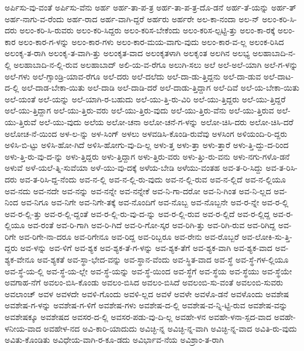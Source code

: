 {ಅರ್ಪಿಸು-ವು-ವಂತೆ
ಅರ್ಪಿಸು-ವೆನು
ಅರ್ಹ
ಅರ್ಹ-ತಾ-ಪ-ತ್ರ
ಅರ್ಹ-ತಾ-ಪ-ತ್ರ-ದೊ-ಡನೆ
ಅರ್ಹ-ತೆ-ಯನ್ನು
ಅರ್ಹ-ತ್
ಅರ್ಹ-ನಾಗು-ವ-ರೆಂದು
ಅರ್ಹ-ರಾದ
ಅರ್ಹ-ವಾಗಿ-ದ್ದರೆ
ಅರ್ಹರು
ಅರ್ಹರೇ
ಅಲ-ಕಾ-ನಂದಾ
ಅಲ-ನ್
ಅಲಂ-ಕರಿ-ಸಿ-ದರು
ಅಲಂ-ಕರಿ-ಸಿ-ರುವರು
ಅಲಂ-ಕರಿ-ಸಿದ್ದರು
ಅಲಂ-ಕರಿಸ-ಬೇಕೆಂದು
ಅಲಂ-ಕರಿಸ-ಲ್ಪಟ್ಟಿ-ತ್ತು
ಅಲಂ-ಕಾ-ರಕ್ಕೆ
ಅಲಂ-ಕಾರ
ಅಲಂ-ಕಾರ-ಗ-ಳನ್ನು
ಅಲಂ-ಕಾರ-ಗಳು
ಅಲಂ-ಕಾರ-ಮಯ-ವಾಗು-ವುದು
ಅಲಂ-ಕಾರ-ವ-ಲ್ಲ
ಅಲಂಕ-ರಿಸಿದ
ಅಲಂಕೃ-ತ-ರಾಗಿ
ಅಲಂಕೃ-ತ-ವಾಗಿ-ತ್ತು
ಅಲಂಕೃತ-ವಾದ
ಅಲಂಕೃತಳಾಗಿ
ಅಲಕೃಂತ
ಅಲಗಿನ
ಅಲಭ್ಯ
ಅಲಹಾಬಾದಿ-ನ-ಲ್ಲಿ
ಅಲಹಾಬಾದಿ-ನ-ಲ್ಲಿ-ರುವ
ಅಲಹಾಬಾದ್
ಅಲಿ-ಯ-ವ-ರೆಗೂ
ಅಲುಗಿ-ಸಲು
ಅಲೆ
ಅಲೆ-ಅಲೆ-ಯಾಗಿ
ಅಲೆ-ಗ-ಳನ್ನು
ಅಲೆ-ಗಳು
ಅಲೆ-ಗ್ಸಾಂಡ್ರಿ-ಯಾವ-ರೆಗೂ
ಅಲೆ-ದರು
ಅಲೆ-ದಲೆದು
ಅಲೆ-ದಾ-ಡು-ತ್ತಿದ್ದನು
ಅಲೆ-ದಾ-ಡುವ
ಅಲೆ-ದಾಟ-ದ-ಲ್ಲಿ
ಅಲೆ-ದಾಡ-ಬೇಕಾ-ಯಿತು
ಅಲೆ-ದಾಡಿ
ಅಲೆ-ದಾಡಿ-ದರೆ
ಅಲೆ-ದಾಡು-ತ್ತಿದ್ದಾಗ
ಅಲೆ-ದಿವೆ
ಅಲೆ-ಯ-ಬೇಕಾ-ಯಿತು
ಅಲೆ-ಯಂತೆ
ಅಲೆ-ಯನ್ನು
ಅಲೆ-ಯಾಗಿ-ರ-ಬಹುದು
ಅಲೆ-ಯು-ತ್ತಿ-ರು-ವಿರಿ
ಅಲೆ-ಯು-ತ್ತಿದ್ದರು
ಅಲೆ-ಯು-ತ್ತಿದ್ದರೆ
ಅಲೆ-ಯು-ತ್ತಿದ್ದಾಗ
ಅಲೆ-ಯು-ತ್ತಿರು-ವರು
ಅಲೆ-ಯು-ತ್ತಿರು-ವುದು
ಅಲೆ-ಯು-ತ್ತಿರು-ವೆನು
ಅಲೆ-ಯು-ತ್ತಿರುವ
ಅಲೆ-ಯು-ತ್ತಿರುವೆ
ಅಲೆ-ಯು-ವುದು
ಅಲೆಯ
ಅಲೋ-ಚನಾ
ಅಲೋ-ಚನೆ-ಗ-ಳನ್ನು
ಅಲೋ-ಚಿಸಿ-ದರು
ಅಲೋ-ಚಿಸಿ-ದರೆ
ಅಲೋಚ-ನೆ-ಯಿಂದ
ಅಳ-ಲ-ನ್ನು
ಅಳ-ಸಿಂಗ್
ಅಳಲು
ಅಳವಡಿಸಿ-ಕೊಂಡಿ-ರುವೆವು
ಅಳಸಿಂಗ
ಅಳಿಯಂದಿ-ರಿ-ದ್ದರು
ಅಳಿಸಿ-ಬಿ-ಟ್ಟು
ಅಳಿಸಿ-ಹೋ-ಗಿದೆ
ಅಳಿಸಿ-ಹೋಗು-ವು-ದಿ-ಲ್ಲ
ಅಳು-ತ್ತ
ಅಳು-ತ್ತಾ
ಅಳು-ತ್ತಾರೆ
ಅಳು-ತ್ತಿ-ದ್ದು-ದ-ರಿಂದ
ಅಳು-ತ್ತಿ-ರು-ವು-ದ-ನ್ನು
ಅಳು-ತ್ತಿದ್ದರು
ಅಳು-ತ್ತಿದ್ದಾಗ
ಅಳು-ತ್ತಿರು-ವರು
ಅಳು-ತ್ತಿು-ರು-ವನು
ಅಳು-ನಗು-ಗಳೊ-ಡನೆ
ಅಳುವೆ
ಅಳೆ-ಯಲೆ-ತ್ನಿ-ಸುವೆಯಾ
ಅಳೆ-ಯು-ವು-ದಕ್ಕೆ
ಅಳೆಯ-ಬೇಡಿ
ಅಳೆಯು-ವಂತಹ
ಅವ-ತ-ರಿ-ಸಿದ್ದು
ಅವ-ತ-ರಿಸಿ-ದರು
ಅವ-ತ-ರಿಸಿ-ದ್ದ-ನೆಂದು
ಅವ-ನ-ಲ್ಲಿ
ಅವ-ನ-ಲ್ಲಿ-ರು-ವುದು
ಅವ-ನ-ಲ್ಲಿ-ರುವ
ಅವ-ನ-ಲ್ಲಿದೆ
ಅವ-ನ-ಲ್ಲಿಯೂ
ಅವ-ನದು
ಅವ-ನದೇ
ಅವ-ನನ್ನು
ಅವ-ನನ್ನೇ
ಅವ-ನನ್ನೇಕೆ
ಅವ-ನಿ-ಗಾ-ದರೋ
ಅವ-ನಿ-ಗಿಂತ
ಅವ-ನಿ-ಲ್ಲದ
ಅವ-ನಿಂದ
ಅವ-ನಿಗೂ
ಅವ-ನಿಗೇ
ಅವ-ನಿಗೇ-ತಕ್ಕೆ
ಅವ-ನೊಂದಿಗೆ
ಅವ-ನೊಬ್ಬ
ಅವ-ನೊಬ್ಬನೇ
ಅವ-ರ-ನ್ನೇ
ಅವ-ರ-ಲ್ಲಿ
ಅವ-ರ-ಲ್ಲಿ-ತ್ತು
ಅವ-ರ-ಲ್ಲಿ-ದ್ದಂತೆ
ಅವ-ರ-ಲ್ಲಿ-ರು-ವು-ದ-ನ್ನು
ಅವ-ರ-ಲ್ಲಿ-ರುವ
ಅವ-ರ-ಲ್ಲಿದೆ
ಅವ-ರ-ಲ್ಲಿದ್ದ
ಅವ-ರ-ಲ್ಲಿಯೂ
ಅವ-ರಂತೆ
ಅವ-ರಿ-ಗಾಗಿ
ಅವ-ರಿ-ಗಿದೆ
ಅವ-ರಿ-ಗೋ-ಸ್ಕರ
ಅವ-ರಿಗಿ-ತ್ತು
ಅವ-ರಿಗಿ-ರುವ
ಅವ-ರಿಗಿದ್ದ
ಅವ-ರಿಗೇ
ಅವ-ರಿಗೇ-ನಾ-ದರೂ
ಅವ-ರಿಗೇನೂ
ಅವ-ರಿದ್ದ
ಅವ-ರಿಬ್ಬರೂ
ಅವ-ರೇನು
ಅವ-ರೊಬ್ಬರೆ
ಅವ-ಲೋಕಿ-ಸು-ತ್ತಿ-ದ್ದರು
ಅವ-ಳನ್ನು
ಅವ-ಳಿಗೆ
ಅವ-ಶ್ಯಕ
ಅವ-ಶ್ಯಕ-ತೆ-ಗ-ಳನ್ನು
ಅವ-ಶ್ಯಕ-ತೆಗೆ
ಅವ-ಶ್ಯಕ-ವಾಗಿ
ಅವ-ಶ್ಯಕ-ವಾದ
ಅವ-ಶ್ಯಕ-ವೇನೂ
ಅವ-ಶ್ಯಕತೆ
ಅವ-ಸ್ಥಾ-ಭೇದ-ವನ್ನು
ಅವ-ಸ್ಥಾನ-ವೆಂದು
ಅವ-ಸ್ಥಿತ-ವಾದ
ಅವ-ಸ್ಥೆ
ಅವ-ಸ್ಥೆ-ಗಳ-ಲ್ಲಿಯೂ
ಅವ-ಸ್ಥೆ-ಯ-ಲ್ಲಿ
ಅವ-ಸ್ಥೆ-ಯ-ಲ್ಲೇ
ಅವ-ಸ್ಥೆ-ಯನ್ನು
ಅವ-ಸ್ಥೆ-ಯಿಂದ
ಅವ-ಸ್ಥೆಗೆ
ಅವ-ಸ್ಥೆಯ
ಅವ-ಸ್ಥೆಯು
ಅವ-ಸ್ಥೆಯೇ
ಅವಗಾಹ-ನೆಗೆ
ಅವಲಂ-ಬಿಸಿ-ಕೊಂಡು
ಅವಲಂ-ಬಿಸಿದ
ಅವಲಂ-ಬಿಸಿದೆ
ಅವಲಂಬಿ-ಸು-ವಂತೆ
ಅವಲಂಬಿ-ಸುವರು
ಅವಲಾಂಚ್
ಅವಳ
ಅವಳದೇ
ಅವಳಿ-ಗೊಂದು
ಅವಳಿ-ಲ್ಲದ
ಅವಳೆ
ಅವಳೇ
ಅವಳೊ-ಡನೆ
ಅವಳೊಂದು
ಅವಶೇಷ
ಅವಶೇಷ-ಗ-ಳನ್ನು
ಅವಶೇಷ-ಗ-ಳಿಗೆ
ಅವಶೇಷ-ಗಳು
ಅವಶೇಷ-ದ-ಲ್ಲಿ
ಅವಶೇಷ-ವ-ನ್ನಿ-ಟ್ಟಿ-ರುವ
ಅವಶೇಷ-ವನ್ನು
ಅವಶೇಷಕ್ಕೂ
ಅವಶೇಷದ
ಅವಸರ-ದ-ಲ್ಲಿ
ಅವಸರ-ಪಡು-ವು-ದಿ-ಲ್ಲ
ಅವಹೇ-ಳನ
ಅವಹೇ-ಳನಾ-ಸ್ಪದ-ವಾದ
ಅವಹೇ-ಳನೀಯ-ವಾದ
ಅವಹೇಳ-ನದ
ಅವಿ-ಕಾರಿ-ಯಾದುದು
ಅವಿಚ್ಛಿ-ನ್ನ
ಅವಿಚ್ಛಿ-ನ್ನ-ವಾಗಿ
ಅವಿಚ್ಛಿ-ನ್ನ-ವಾದ
ಅವಿತಿ-ರು-ವುದು
ಅವಿತು-ಕೊಂಡಿತು
ಅವಿಧೇಯ-ವಾಗಿ-ರ-ಕೂ-ಡದು
ಅವಿರ್ಭಾವ-ನೆಯ
ಅವಿಶ್ರಾಂ-ತ-ರಾಗಿ
}

